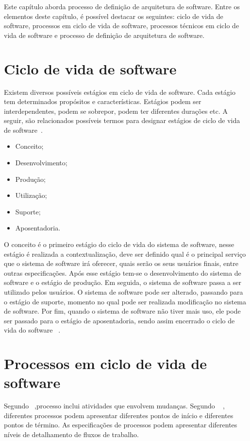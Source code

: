 Este capítulo aborda processo de definição de arquitetura de software. Entre os elementos deste capítulo, é possível destacar os seguintes: ciclo de vida de software, processos em ciclo de vida de software, processos técnicos em ciclo de vida de software e processo de definição de arquitetura de software.

\section{Ciclo de vida de software}

Existem diversos possíveis estágios em ciclo de vida de software. Cada estágio tem determinados propósitos e características. Estágios podem ser interdependentes, podem se sobrepor, podem ter diferentes durações etc. A seguir, são relacionados possíveis termos para designar estágios de ciclo de vida de software~\cite{ISO_247483}. 

\begin{itemize}
    \item Conceito;
    \item Desenvolvimento;
    \item Produção;
    \item Utilização;
    \item Suporte;
    \item Aposentadoria.
\end{itemize}

O conceito é o primeiro estágio do ciclo de vida do sistema de software, nesse estágio é realizada a contextualização, deve ser definido qual é o principal serviço que o sistema de software irá oferecer, quais serão os seus usuários finais, entre outras especificações. Após esse estágio tem-se o desenvolvimento do sistema de software e o estágio de produção. Em seguida, o sistema de software passa a ser utilizado pelos usuários. O sistema de software pode ser alterado, passando para o estágio de suporte, momento no qual pode ser realizada modificação no sistema de software. Por fim, quando o sistema de software não tiver mais uso, ele pode ser passado para o estágio de aposentadoria, sendo assim encerrado o ciclo de vida do software ~\cite{ISO_247483}.

\section{Processos em ciclo de vida de software}

Segundo ~\cite{Sommerville_2011_texbook},processo inclui atividades que envolvem mudanças. Segundo ~\cite{Sevocab} , diferentes processos podem apresentar diferentes pontos de início e diferentes pontos de término. As especificações de processos podem apresentar diferentes níveis de detalhamento de fluxos de trabalho.

